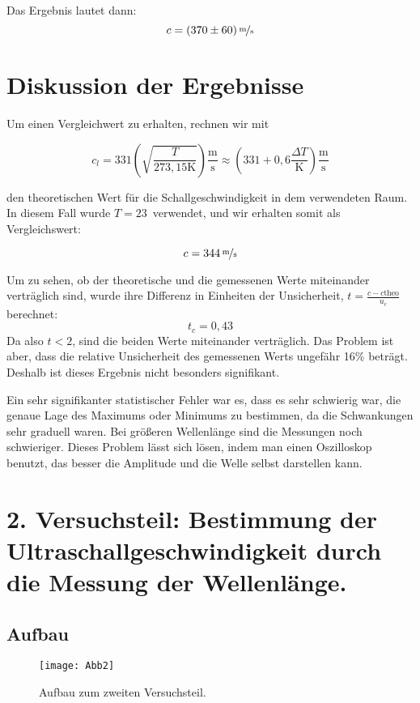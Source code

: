 \documentclass[11pt,a4paper]{article}
\begin{document}
Das Ergebnis lautet dann:
$$ c= (370 \pm 60)\,\nicefrac{\mathrm{m}}{\mathrm{s}}$$








\section{Diskussion der Ergebnisse}

Um einen Vergleichwert zu erhalten, rechnen wir mit

\[
c_l=331\left(\sqrt{\frac{T}{273,15\mathrm{K}}}\right)\frac{\mathrm{m}}{\mathrm{s}}\approx\left(331+0,6\frac{\Delta T}{\mathrm{K}}\right)\mathrm{\frac{m}{s}}
\]

den theoretischen Wert f\"ur die Schallgeschwindigkeit in dem verwendeten Raum. In diesem Fall wurde $T=23$\celsius\ verwendet, und wir erhalten somit als Vergleichswert:

\[
c = 344\,\nicefrac{\mathrm{m}}{\mathrm{s}}
\]

Um zu sehen, ob der theoretische und die gemessenen Werte miteinander verträglich sind, wurde ihre Differenz in Einheiten der Unsicherheit, $t = \frac{c-c\textrm{theo}}{u_c}$ berechnet: 
$$t_c = 0,43$$
Da also $t<2$, sind die beiden Werte miteinander verträglich. Das Problem ist aber, dass die relative Unsicherheit des gemessenen Werts ungefähr 16\% beträgt. Deshalb ist dieses Ergebnis nicht besonders signifikant.

Ein sehr signifikanter statistischer Fehler war es, dass es sehr schwierig war, die genaue Lage des Maximums oder Minimums zu bestimmen, da die Schwankungen sehr graduell waren. Bei größeren Wellenlänge sind die Messungen noch schwieriger. Dieses Problem lässt sich lösen, indem man einen Oszilloskop benutzt, das besser die Amplitude und die Welle selbst darstellen kann. 

\pagebreak

\section{2. Versuchsteil: Bestimmung der Ultraschallgeschwindigkeit durch die Messung der Wellenlänge.}
\subsection{Aufbau}
\begin{figure}
	\centering
	\texttt{[image: Abb2]}
	\caption{Aufbau zum zweiten Versuchsteil. \cite{Anleitung}}
\end{figure}
\end{document}
